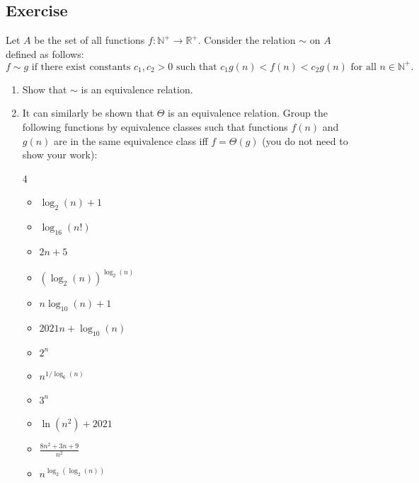 \documentclass{article}
\newcounter{counter}
\newcommand{\Exercise}{Exercise \stepcounter{counter}\thecounter}
\begin{document}
\subsection*{\Exercise} %
    Let $A$ be the set of all functions $f: \mathbb{N}^{+} \rightarrow \mathbb{R}^{+}$. Consider the relation $\sim$ on $A$ defined as follows: $$\text{$f \sim g$ if there exist constants $c_{1}, c_{2} > 0$ such that $c_{1}g(n) < f(n) < c_{2}g(n)$ for all $n \in \mathbb{N}^{+}$.}$$
    \begin{enumerate}
        \item Show that $\sim$ is an equivalence relation.
        \item It can similarly be shown that $\Theta$ is an equivalence relation. Group the following functions by equivalence classes such that functions $f(n)$ and $g(n)$ are in the same equivalence class iff $f = \Theta(g)$ (you do not need to show your work): 
        \begin{multicols}{4}
        \begin{itemize}
            \item $\log_{2}(n) + 1$
            \item $\log_{16}(n!)$
            \item $2n + 5$
            \item $(\log_{2}(n))^{\log_{2}(n)}$
            \item $n\log_{10}(n) + 1$
            \item $2021n + \log_{10}(n)$
            \item $2^{n}$
            \item $n^{1/\log_{6}(n)}$
            \item $3^{n}$
            \item $\ln(n^{2}) + 2021$
            \item $\frac{8n^{2} + 3n + 9}{n^{2}}$
            \item $n^{\log_{2}(\log_{2}(n))}$
        \end{itemize}
        \end{multicols}
    \end{enumerate}
\end{document}
